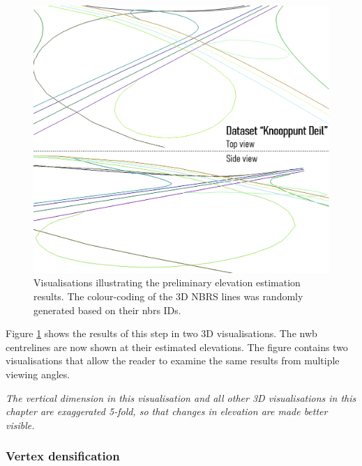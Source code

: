 \begin{figure}
    \centering
    \includegraphics[width=\linewidth]{final_report/figs/elevationestimation0.png}
    \caption[Visualisations illustrating the preliminary elevation estimation results]{Visualisations illustrating the preliminary elevation estimation results. The colour-coding of the 3D NBRS lines was randomly generated based on their \ac{nbrs} IDs.}
    \label{fig:elevationestimation0}
\end{figure}

Figure \ref{fig:elevationestimation0} shows the results of this step in two 3D visualisations. The \ac{nwb} centrelines are now shown at their estimated elevations. The figure contains two visualisations that allow the reader to examine the same results from multiple viewing angles. 

\textit{The vertical dimension in this visualisation and all other 3D visualisations in this chapter are exaggerated 5-fold, so that changes in elevation are made better visible.}

\subsubsection{Vertex densification}

